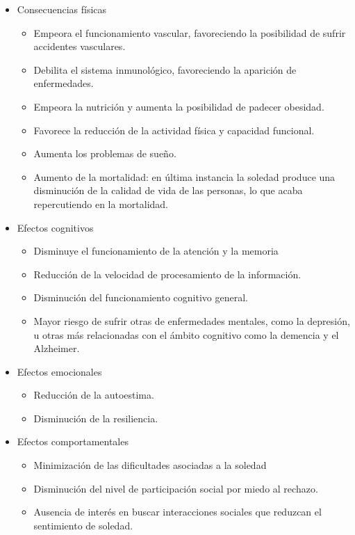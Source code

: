         \begin{itemize}
            \item Consecuencias físicas
                \begin{itemize}
                    \item Empeora el funcionamiento vascular, favoreciendo la posibilidad de sufrir accidentes vasculares.
                    \item Debilita el sistema inmunológico, favoreciendo la aparición de enfermedades.
                    \item Empeora la nutrición y aumenta la posibilidad de padecer obesidad.
                    \item Favorece la reducción de la actividad física y capacidad funcional.
                    \item Aumenta los problemas de sueño.
                    \item Aumento de la mortalidad: en última instancia la soledad produce una disminución de la calidad de vida de las personas, lo que acaba repercutiendo en la mortalidad.
                \end{itemize}
            \item Efectos cognitivos
                \begin{itemize}
                    \item Disminuye el funcionamiento de la atención y la memoria
                    \item Reducción de la velocidad de procesamiento de la información.
                    \item Disminución del funcionamiento cognitivo general.
                    \item Mayor riesgo de sufrir otras de enfermedades mentales, como la depresión, u otras más relacionadas con el ámbito cognitivo como la demencia y el Alzheimer.
                \end{itemize}
            \item Efectos emocionales
                \begin{itemize}
                    \item Reducción de la autoestima.
                    \item Disminución de la resiliencia.
                \end{itemize}
            \item Efectos comportamentales
                \begin{itemize}
                    \item Minimización de las dificultades asociadas a la soledad
                    \item Disminución del nivel de participación social por miedo al rechazo.
                    \item Ausencia de interés en buscar interacciones sociales que reduzcan el sentimiento de soledad.
                \end{itemize}
        \end{itemize}
    

